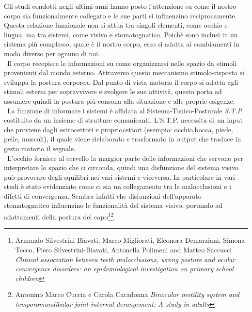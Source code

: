 



Gli studi condotti negli ultimi anni hanno posto l'attenzione su come il nostro corpo sia funzionalmente collegato e le sue parti si influenzino reciprocamente. Questa relazione funzionale non si attua tra singoli elementi, come occhio e lingua, ma tra sistemi, come visivo e stomatognatico. Poichè sono inclusi in un sistema più complesso, quale è il nostro corpo, esso si adatta ai cambiamenti in modo diverso per ognuno di noi.
\\\
Il corpo recepisce le informazioni su come organizzarsi nello spazio da stimoli provenienti dal mondo esterno. Attraverso questo meccanismo stimolo-risposta si sviluppa la postura corporea. Dal punto di vista motorio il corpo si adatta agli stimoli esterni per sopravvivere e svolgere le sue attività, questo porta ad assumere quindi la postura più consona alla situazione e alle proprie esigenze. 
\\\
La funzione di informare i sistemi è affidata al Sistema-Tonico-Posturale \emph{S.T.P.} costituito da un insieme di strutture comunicanti. L'S.T.P. necessita di un input che proviene dagli estrocettori e propriocettori (esempio: occhio,bocca, piede, pelle, muscoli), il quale viene rielaborato e trasformato in output che traduce in gesto motorio il segnale.
\\\
L'occhio fornisce al cervello la maggior parte delle informazioni che servono per interpretare lo spazio che ci circonda, quindi una disfunzione del sistema visivo può provocare degli squilibri nei vari sistemi e viceversa. In particolare in vari studi è stato evidenziato come ci sia un collegamento tra le malocclusioni e i difetti di convergenza. Sembra infatti che disfunzioni dell'apparato stomatognatico influenzino le funzionalità del sistema visivo, portando ad adattamenti della postura del capo\footnote{Armando Silvestrini-Biavati, Marco Migliorati, Eleonora Demarziani, Simona Tecco, Piero Silvestrini-Biavati, Antonella Polimeni and Matteo Saccucci \emph{Clinical association between teeth malocclusions, wrong posture and ocular convergence disorders: an epidemiological investigation on primary school children}}\footnote{Antonino Marco Cuccia e Carola Caradonna \emph{Binocular motility system and temporomandibular joint internal derangement: A study in adults}}. 



